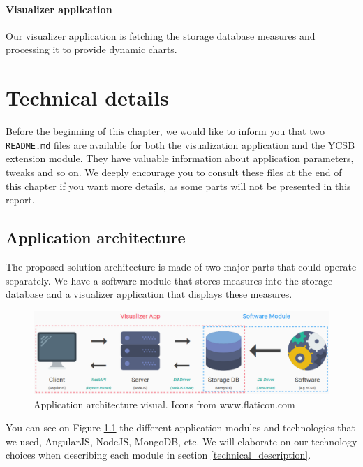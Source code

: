 \documentclass[a4paper,11pt]{report}
\begin{document}
\subsubsection{Visualizer application}

Our visualizer application is fetching the storage database measures and processing it to provide dynamic charts.

\clearpage

\chapter{Technical details}\label{techical_chapter}

Before the beginning of this chapter, we would like to inform you that two \texttt{README.md} files are available for both the visualization application and the YCSB extension module. They have valuable information about application parameters, tweaks and so on. We deeply encourage you to consult these files at the end of this chapter if you want more details, as some parts will not be presented in this report.

\section{Application architecture}\label{app_archi_section}

The proposed solution architecture is made of two major parts that could operate separately. We have a software module that stores measures into the storage database and a visualizer application that displays these measures.

\begin{figure}[ht]
\begin{center}
\includegraphics[width=1\linewidth]{images/archi_small_complete.png}
\caption{Application architecture visual. Icons from www.flaticon.com}
\label{app_archi_fig}
\end{center}
\end{figure}

You can see on Figure \ref{app_archi_fig} the different application modules and technologies that we used, AngularJS, NodeJS, MongoDB, etc. We will elaborate on our technology choices when describing each module in section \ref{technical_description}. 
\end{document}
